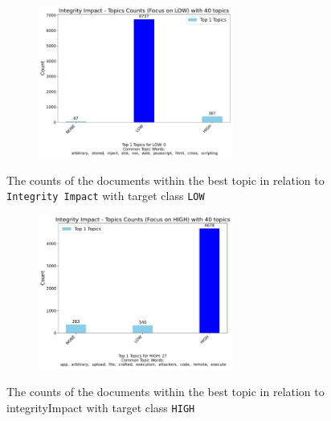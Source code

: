 \documentclass[12pt]{article}
\begin{document}
\begin{figure}
	\ContinuedFloat
	\centering
	\begin{subfigure}{\textwidth}
		\centering
		\includegraphics[width=0.7\textwidth]{figures/integrityImpact/merged_top_k_topics_category_focus_counts_integrityImpact_LOW_k1.pdf}
	\end{subfigure}

	\caption{The counts of the documents within the best topic in relation to \texttt{Integrity Impact} with target class \texttt{LOW}}
	\label{fig:integrityImpact_60_LOW}
\end{figure}

\begin{figure}
	\ContinuedFloat
	\centering
	\begin{subfigure}{\textwidth}
		\centering
		\includegraphics[width=0.7\textwidth]{figures/integrityImpact/merged_top_k_topics_category_focus_counts_integrityImpact_HIGH_k1.pdf}
	\end{subfigure}

	\caption{The counts of the documents within the best topic in relation to integrityImpact with target class \texttt{HIGH}}
	\label{fig:integrityImpact_60_HIGH}
\end{figure}
\end{document}

